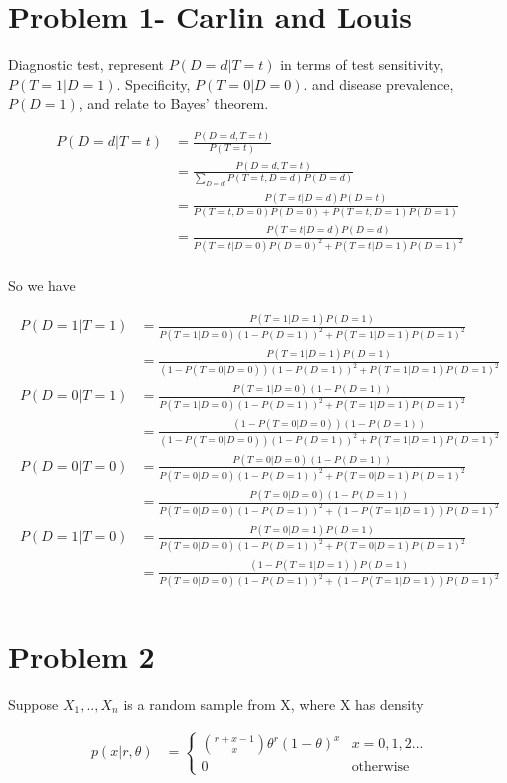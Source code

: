 

\section{Problem 1- Carlin and Louis}
Diagnostic test, represent $P(D=d|T=t)$ in terms of test sensitivity, $P(T=1|D=1)$. Specificity, $P(T= 0|D= 0)$. and disease prevalence, $P(D=1)$, and relate to Bayes' theorem.
 
\begin{align*}
	P(D=d|T=t) &= \frac{P(D=d, T=t)}{P(T=t)} \\
	&= \frac{P(D=d, T=t)}{\sum_{D=d} P(T=t, D=d) P(D=d)} \\
	&= \frac{P(T=t|D=d) P(D=t)}{P(T=t, D=0)P(D=0) + P(T=t, D=1)P(D=1)}\\
	&= \frac{P(T=t|D=d) P(D=d)}{P(T=t|D=0)P(D=0)^2 + P(T=t|D=1)P(D=1)^2} \\
\end{align*}

So we have

\begin{align*}
P(D= 1|T= 1) &= \frac{P(T= 1|D= 1) P(D=1)}{P(T=1|D=0)(1- P(D=1))^2 + P(T=1|D=1)P(D=1)^2} \\
&=  \frac{P(T= 1|D= 1) P(D=1)}{(1- P(T=0|D=0))(1- P(D=1))^2 + P(T=1|D=1)P(D=1)^2} \\
P(D= 0|T= 1) &= \frac{P(T= 1|D= 0) (1-P(D=1))}{P(T=1|D=0)(1- P(D=1))^2 + P(T=1|D=1)P(D=1)^2} \\
&=  \frac{(1- P(T=0|D=0)) (1-P(D=1))}{(1- P(T=0|D=0))(1- P(D=1))^2 + P(T=1|D=1)P(D=1)^2} \\
P(D= 0|T= 0) &= \frac{P(T= 0|D= 0) (1-P(D=1))}{P(T=0|D=0)(1- P(D=1))^2 + P(T=0|D=1)P(D=1)^2} \\
&=  \frac{P(T=0|D=0) (1-P(D=1))}{ P(T=0|D=0)(1- P(D=1))^2 + (1- P(T=1|D=1)) P(D=1)^2} \\
P(D= 1|T= 0) &= \frac{P(T= 0|D= 1) P(D=1)}{P(T=0|D=0)(1- P(D=1))^2 + P(T=0|D=1)P(D=1)^2} \\
&=  \frac{ (1- P(T=1|D=1)) P(D=1)}{ P(T=0|D=0)(1- P(D=1))^2 + (1- P(T=1|D=1)) P(D=1)^2} \\
\end{align*}

\section{Problem 2}
Suppose $X_1, .., X_n$ is a random sample from X, where X has density 

\begin{align}
	p(x|r, \theta) &= \begin{cases} 
		{r+x-1 \choose x} \theta^{r} (1-\theta)^{x} & x=0,1,2...\\
	     0 & \text{otherwise}
	\end{cases}
\end{align}

